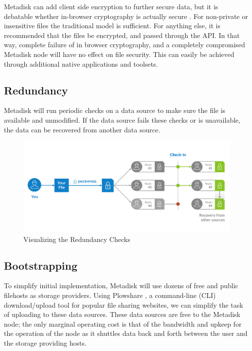 \documentclass[a4paper,10pt]{article}
\begin{document}
Metadisk can add client side encryption to further secure data, but it is debatable whether in-browser cryptography is actually secure \cite{5}. For non-private or insensitive files the traditional model is sufficient. For anything else, it is recommended that the files be encrypted, and passed through the API. In that way, complete failure of in browser cryptography, and a completely compromised Metadisk node will have no effect on file security. This can easily be achieved through additional native applications and toolsets.   

\subsection*{Redundancy}

Metadisk will run periodic checks on a data source to make sure the file is available and unmodified. If the data source fails these checks or is unavailable, the data can be recovered from another data source.
 
\begin{figure}[h!]
  \centering
      \includegraphics[width=\linewidth]{03}
  \caption{Visualizing the Redundancy Checks }
\end{figure}

\subsection*{Bootstrapping}

To simplify initial implementation, Metadisk will use dozens of free and public filehosts as storage providers. Using Plowshare \cite{6}, a command-line (CLI) download/upload tool for popular file sharing websites, we can simplify the task of uploading to these data sources.  These data sources are free to the Metadisk node; the only marginal operating cost is that of the bandwidth and upkeep for the operation of the node as it shuttles data back and forth between the user and the storage providing hosts. \\
\end{document}
